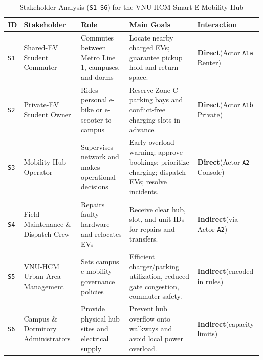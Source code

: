 \begin{table}[H]
  \centering
  \singlespacing\footnotesize
  \caption{Stakeholder Analysis (\texttt{S1}--\texttt{S6}) for the VNU-HCM Smart E-Mobility Hub}
  \label{tab:stakeholders}
  \renewcommand{\arraystretch}{1.24}
  \begin{tabularx}{\textwidth}{|C{1.0cm}|L{3.1cm}|L{3.2cm}|Y|L{2.8cm}|}
    \hline
    \textbf{ID} & \textbf{Stakeholder} & \textbf{Role} & \textbf{Main Goals} & \textbf{Interaction} \\
    \hline
    \texttt{S1} & Shared-EV Student Commuter & Commutes between Metro Line 1, campuses, and dorms & Locate nearby charged EVs; guarantee pickup hold and return space. & \textbf{Direct}\newline(Actor \texttt{A1a} Renter) \\
    \hline
    \texttt{S2} & Private-EV Student Owner & Rides personal e-bike or e-scooter to campus & Reserve Zone C parking bays and conflict-free charging slots in advance. & \textbf{Direct}\newline(Actor \texttt{A1b} Private) \\
    \hline
    \texttt{S3} & Mobility Hub Operator & Supervises network and makes operational decisions & Early overload warning; approve bookings; prioritize charging; dispatch EVs; resolve incidents. & \textbf{Direct}\newline(Actor \texttt{A2} Console) \\
    \hline
    \texttt{S4} & Field Maintenance \& Dispatch Crew & Repairs faulty hardware and relocates EVs & Receive clear hub, slot, and unit IDs for repairs and transfers. & \textbf{Indirect}\newline(via Actor \texttt{A2}) \\
    \hline
    \texttt{S5} & VNU-HCM Urban Area Management & Sets campus e-mobility governance policies & Efficient charger/parking utilization, reduced gate congestion, commuter safety. & \textbf{Indirect}\newline(encoded in rules) \\
    \hline
    \texttt{S6} & Campus \& Dormitory Administrators & Provide physical hub sites and electrical supply & Prevent hub overflow onto walkways and avoid local power overload. & \textbf{Indirect}\newline(capacity limits) \\
    \hline
  \end{tabularx}
\end{table}

